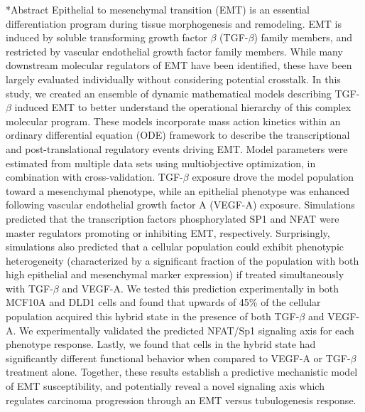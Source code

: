 \documentclass[12pt]{article}
\makeatletter
\renewcommand\section{\@startsection
	{subsection}{2}{0mm}
	{-0.2in}
	{0.05\baselineskip}
	{\normalfont\large\bfseries}}
\makeatother
\begin{document}
\section*{Abstract}
Epithelial to mesenchymal transition (EMT) is an essential differentiation program during tissue morphogenesis and remodeling.
EMT is induced by soluble transforming growth factor $\beta$ (TGF-$\beta$) family members, and restricted by vascular endothelial growth factor family members.
While many downstream molecular regulators of EMT have been identified, these have been largely evaluated individually without considering potential crosstalk.
In this study, we created an ensemble of dynamic mathematical models describing TGF-$\beta$ induced EMT to better understand the operational hierarchy of this complex molecular program.
These models incorporate mass action kinetics within an ordinary differential equation (ODE) framework to describe the transcriptional and post-translational regulatory events driving EMT.
Model parameters were estimated from multiple data sets using multiobjective optimization, in combination with cross-validation.
TGF-$\beta$ exposure drove the model population toward a mesenchymal phenotype, while an epithelial phenotype was enhanced following vascular endothelial growth factor A (VEGF-A) exposure.
Simulations predicted that the transcription factors phosphorylated SP1 and NFAT were master regulators promoting or inhibiting EMT, respectively.
Surprisingly, simulations also predicted that a cellular population could exhibit phenotypic heterogeneity (characterized by a significant fraction of the population with both high epithelial and mesenchymal marker expression)
if treated simultaneously with TGF-$\beta$ and VEGF-A.  We tested this prediction experimentally in both MCF10A and DLD1 cells and found that upwards of 45\% of the cellular population acquired this hybrid state in the presence of both TGF-$\beta$ and VEGF-A.
We experimentally validated the predicted NFAT/Sp1 signaling axis for each phenotype response. Lastly, we found that cells in the hybrid state had significantly different functional behavior when compared to VEGF-A or TGF-$\beta$ treatment alone.
Together, these results establish a predictive mechanistic model of EMT susceptibility, and potentially reveal a novel signaling axis which regulates carcinoma progression through an EMT versus tubulogenesis response.
\end{document}
